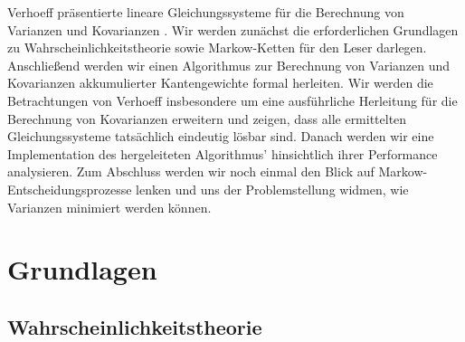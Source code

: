 \documentclass[a4paper]{article}
\newcommand{\mc}{Markow-Kette}
\theoremstyle{nonumberplain}
\begin{document}
Verhoeff präsentierte lineare Gleichungssysteme für die Berechnung von Varianzen und Kovarianzen \cite{Verh04}. Wir werden zunächst die erforderlichen Grundlagen zu Wahrscheinlichkeitstheorie sowie \mc{}n für den Leser darlegen. Anschließend werden wir einen Algorithmus zur Berechnung von Varianzen und Kovarianzen akkumulierter Kantengewichte formal herleiten. Wir werden  die Betrachtungen von Verhoeff insbesondere um eine ausführliche Herleitung für die Berechnung von Kovarianzen erweitern und zeigen, dass alle ermittelten Gleichungssysteme tatsächlich eindeutig lösbar sind. Danach werden wir eine Implementation des hergeleiteten Algorithmus' hinsichtlich ihrer Performance analysieren. Zum Abschluss werden wir noch einmal den Blick auf Markow-Entscheidungsprozesse lenken und uns der Problemstellung widmen, wie Varianzen minimiert werden können.

\section{Grundlagen}

\subsection{Wahrscheinlichkeitstheorie}
\end{document}

